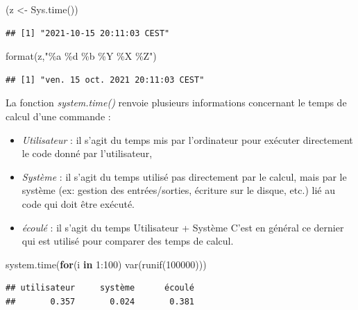 \documentclass[
]{book}
\newenvironment{Shaded}{\begin{snugshade}}{\end{snugshade}}
\newcommand{\ControlFlowTok}[1]{\textcolor[rgb]{0.13,0.29,0.53}{\textbf{#1}}}
\newcommand{\DecValTok}[1]{\textcolor[rgb]{0.00,0.00,0.81}{#1}}
\newcommand{\FunctionTok}[1]{\textcolor[rgb]{0.00,0.00,0.00}{#1}}
\newcommand{\NormalTok}[1]{#1}
\newcommand{\OtherTok}[1]{\textcolor[rgb]{0.56,0.35,0.01}{#1}}
\newcommand{\SpecialCharTok}[1]{\textcolor[rgb]{0.00,0.00,0.00}{#1}}
\newcommand{\StringTok}[1]{\textcolor[rgb]{0.31,0.60,0.02}{#1}}
\theoremstyle{definition}
\theoremstyle{definition}
\theoremstyle{definition}
\theoremstyle{definition}
\theoremstyle{remark}
\begin{document}
\begin{Shaded}
\begin{Highlighting}[]
\NormalTok{(z }\OtherTok{\textless{}{-}} \FunctionTok{Sys.time}\NormalTok{())}
\end{Highlighting}
\end{Shaded}

\begin{verbatim}
## [1] "2021-10-15 20:11:03 CEST"
\end{verbatim}

\begin{Shaded}
\begin{Highlighting}[]
\FunctionTok{format}\NormalTok{(z,}\StringTok{"\%a \%d \%b \%Y \%X \%Z"}\NormalTok{)}
\end{Highlighting}
\end{Shaded}

\begin{verbatim}
## [1] "ven. 15 oct. 2021 20:11:03 CEST"
\end{verbatim}

La fonction \emph{system.time()} renvoie plusieurs informations concernant le temps de calcul d'une commande :

\begin{itemize}
\item
  \emph{Utilisateur} : il s'agit du temps mis par l'ordinateur pour exécuter directement le code donné par l'utilisateur,
\item
  \emph{Système} : il s'agit du temps utilisé pas directement par le calcul, mais par le système (ex: gestion des entrées/sorties, écriture sur le disque, etc.) lié au code qui doit être exécuté.
\item
  \emph{écoulé} : il s'agit du temps Utilisateur + Système C'est en général ce dernier qui est utilisé pour comparer des temps de calcul.
\end{itemize}

\begin{Shaded}
\begin{Highlighting}[]
\FunctionTok{system.time}\NormalTok{(}\ControlFlowTok{for}\NormalTok{(i }\ControlFlowTok{in} \DecValTok{1}\SpecialCharTok{:}\DecValTok{100}\NormalTok{) }\FunctionTok{var}\NormalTok{(}\FunctionTok{runif}\NormalTok{(}\DecValTok{100000}\NormalTok{)))}
\end{Highlighting}
\end{Shaded}

\begin{verbatim}
## utilisateur     système      écoulé 
##       0.357       0.024       0.381
\end{verbatim}
\end{document}
